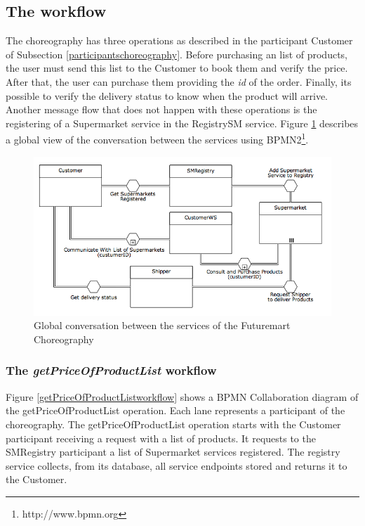 \subsection{The workflow}
The choreography has three operations as described in the participant Customer of Subsection \ref{participantschoreography}. Before purchasing an list of products, the user must send this list to the Customer to book them and verify the price. After that, the user can purchase them providing the \emph{id} of the order. Finally, its possible to verify the delivery status to know when the product will arrive. Another message flow that does not happen with these operations is the registering of a Supermarket service in the RegistrySM service. Figure \ref{futuremartConversation} describes a global view of the conversation between the services using BPMN2\footnote{http://www.bpmn.org}.

\begin{figure}[htbp]
\begin{center}
	\includegraphics[width=\textwidth]{images/futuremartConversation}
\caption{Global conversation between the services of the Futuremart Choreography}
\label{futuremartConversation}
\end{center}
\end{figure}

\subsubsection{The \emph{getPriceOfProductList} workflow}
Figure \ref{getPriceOfProductListworkflow} shows a BPMN Collaboration diagram of the getPriceOfProductList operation. Each lane represents a participant of the choreography. The getPriceOfProductList operation starts with the Customer participant receiving a request with a list of products. It requests to the SMRegistry participant a list of Supermarket services registered. The registry service collects, from its database, all service endpoints stored and returns it to the Customer.

